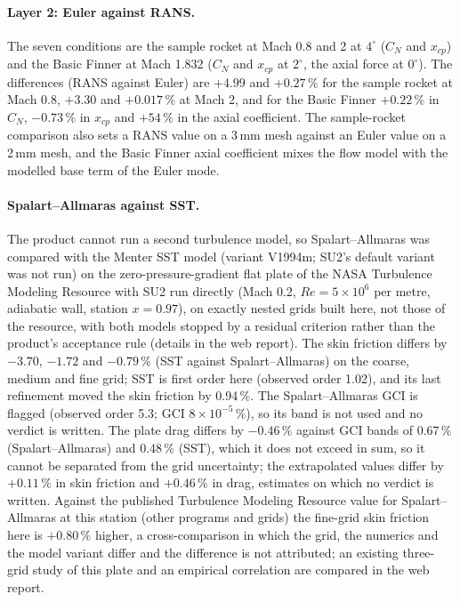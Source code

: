 \documentclass[twocolumn]{labreport}
\begin{document}
\paragraph{Layer 2: Euler against RANS.}
The seven conditions are the sample rocket at Mach 0.8 and 2 at $4^\circ$ ($C_N$ and $x_{cp}$) and the Basic Finner at Mach 1.832 ($C_N$ and $x_{cp}$ at $2^\circ$, the axial force at $0^\circ$).
The differences (RANS against Euler) are $+4.99$ and $+0.27\,\%$ for the sample rocket at Mach 0.8, $+3.30$ and $+0.017\,\%$ at Mach 2, and for the Basic Finner $+0.22\,\%$ in $C_N$, $-0.73\,\%$ in $x_{cp}$ and $+54\,\%$ in the axial coefficient.
The sample-rocket comparison also sets a RANS value on a 3\,mm mesh against an Euler value on a 2\,mm mesh, and the Basic Finner axial coefficient mixes the flow model with the modelled base term of the Euler mode.

\paragraph{Spalart--Allmaras against SST.}
\label{sec:model}
The product cannot run a second turbulence model, so Spalart--Allmaras was compared with the Menter SST model (variant V1994m; SU2's default variant was not run) on the zero-pressure-gradient flat plate of the NASA Turbulence Modeling Resource \citep{tmr} with SU2 run directly (Mach 0.2, $Re=5\times10^{6}$ per metre, adiabatic wall, station $x=0.97$), on exactly nested grids built here, not those of the resource, with both models stopped by a residual criterion rather than the product's acceptance rule (details in the web report).
The skin friction differs by $-3.70$, $-1.72$ and $-0.79\,\%$ (SST against Spalart--Allmaras) on the coarse, medium and fine grid; SST is first order here (observed order 1.02), and its last refinement moved the skin friction by 0.94\,\%.
The Spalart--Allmaras GCI is flagged (observed order 5.3; GCI $8\times10^{-5}\,\%$), so its band is not used and no verdict is written.
The plate drag differs by $-0.46\,\%$ against GCI bands of 0.67\,\% (Spalart--Allmaras) and 0.48\,\% (SST), which it does not exceed in sum, so it cannot be separated from the grid uncertainty; the extrapolated values differ by $+0.11\,\%$ in skin friction and $+0.46\,\%$ in drag, estimates on which no verdict is written.
Against the published Turbulence Modeling Resource value for Spalart--Allmaras at this station (other programs and grids) the fine-grid skin friction here is $+0.80\,\%$ higher, a cross-comparison in which the grid, the numerics and the model variant differ and the difference is not attributed; an existing three-grid study of this plate and an empirical correlation are compared in the web report.
\end{document}
